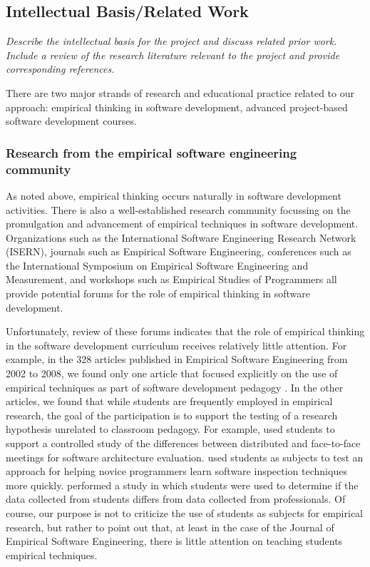 \subsection{Intellectual Basis/Related Work}

{\em Describe the intellectual basis for the project and discuss related prior work.  Include a review of the research literature relevant to the project and provide corresponding references. }

There are two major strands of research and educational practice related to our approach: empirical thinking in software development, advanced project-based software development courses. 

\subsubsection{Research from the empirical software engineering community}

As noted above, empirical thinking occurs naturally in software development
activities.  There is also a well-established research community focussing
on the promulgation and advancement of empirical techniques in software
development.  Organizations such as the International Software Engineering
Research Network (ISERN), journals such as Empirical Software Engineering,
conferences such as the International Symposium on Empirical Software
Engineering and Measurement, and workshops such as Empirical Studies of
Programmers all provide potential forums for the role of empirical thinking
in software development.

Unfortunately, review of these forums indicates that the role of empirical
thinking in the software development curriculum receives relatively little
attention.  For example, in the 328 articles published in Empirical
Software Engineering from 2002 to 2008, we found only one article that
focused explicitly on the use of empirical techniques as part of software
development pedagogy \cite{Pfahl03}.  In the other articles, we found that
while students are frequently employed in empirical research, the goal of
the participation is to support the testing of a research hypothesis
unrelated to classroom pedagogy.  For example, \cite{Babar08} used students
to support a controlled study of the differences between distributed and
face-to-face meetings for software architecture evaluation.
\cite{Carver06} used students as subjects to test an approach for helping
novice programmers learn software inspection techniques more quickly.
\cite{Host00} performed a study in which students were used to determine if
the data collected from students differs from data collected from
professionals.  Of course, our purpose is not to criticize the use of
students as subjects for empirical research, but rather to point out that,
at least in the case of the Journal of Empirical Software Engineering,
there is little attention on teaching students empirical techniques.

